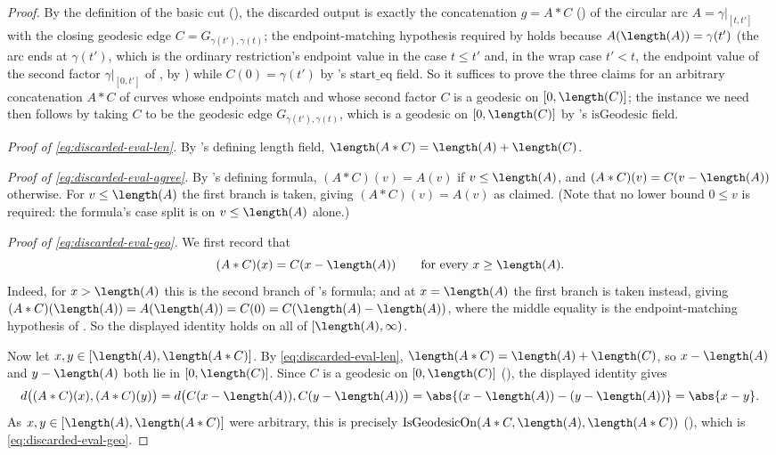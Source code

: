 \begin{proof}
  By the definition of the basic cut (), the discarded output is exactly the
  concatenation $g = A * C$ () of the circular arc $A = \gamma|_{[t,t']}$ with
  the closing geodesic edge $C = G_{\gamma(t'),\gamma(t)}$; the endpoint-matching hypothesis
  required by  holds because $A(\length(A)) = \gamma(t')$ (the arc ends at
  $\gamma(t')$, which is the ordinary restriction's endpoint value in the case $t \le t'$ and, in
  the wrap case $t'<t$, the endpoint value of the second factor $\gamma|_{[0,t']}$ of
  , by ) while $C(0) = \gamma(t')$ by
  's $\mathrm{start\_eq}$ field. So it suffices to prove the three claims
  for an arbitrary concatenation $A * C$ of curves whose endpoints match and whose second factor
  $C$ is a geodesic on $[0,\length(C)]$; the instance we need then follows by taking $C$ to be the
  geodesic edge $G_{\gamma(t'),\gamma(t)}$, which is a geodesic on $[0,\length(C)]$ by
  's $\mathrm{isGeodesic}$ field.

  \emph{Proof of \eqref{eq:discarded-eval-len}.} By 's defining length field,
  $\length(A * C) = \length(A) + \length(C)$.

  \emph{Proof of \eqref{eq:discarded-eval-agree}.} By 's defining formula,
  $(A*C)(v) = A(v)$ if $v \le \length(A)$, and $(A*C)(v) = C(v-\length(A))$ otherwise. For
  $v \le \length(A)$ the first branch is taken, giving $(A*C)(v) = A(v)$ as claimed. (Note that no
  lower bound $0 \le v$ is required: the formula's case split is on $v \le \length(A)$ alone.)

  \emph{Proof of \eqref{eq:discarded-eval-geo}.} We first record that
  \[
    (A*C)(x) = C(x-\length(A)) \qquad \text{for every } x \ge \length(A) .
  \]
  Indeed, for $x > \length(A)$ this is the second branch of 's formula; and at
  $x = \length(A)$ the first branch is taken instead, giving $(A*C)(\length(A)) = A(\length(A)) =
  C(0) = C(\length(A)-\length(A))$, where the middle equality is the endpoint-matching hypothesis of
  . So the displayed identity holds on all of $[\length(A),\infty)$.

  Now let $x,y \in [\length(A),\length(A*C)]$. By \eqref{eq:discarded-eval-len},
  $\length(A*C) = \length(A)+\length(C)$, so $x - \length(A)$ and $y - \length(A)$ both lie in
  $[0,\length(C)]$. Since $C$ is a geodesic on $[0,\length(C)]$ (), the
  displayed identity gives
  \[
    d\bigl((A*C)(x),(A*C)(y)\bigr) = d\bigl(C(x-\length(A)),C(y-\length(A))\bigr)
      = \abs{(x-\length(A)) - (y-\length(A))} = \abs{x-y} .
  \]
  As $x,y \in [\length(A),\length(A*C)]$ were arbitrary, this is precisely
  $\mathrm{IsGeodesicOn}(A*C,\length(A),\length(A*C))$ (), which is
  \eqref{eq:discarded-eval-geo}.
\end{proof}
